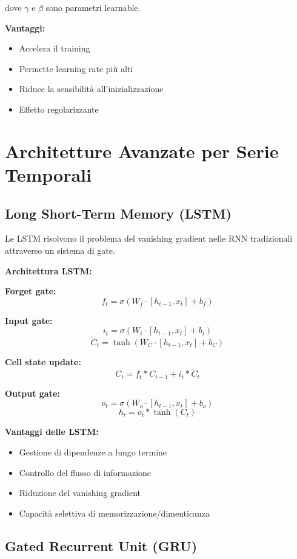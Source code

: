 \documentclass[12pt,a4paper,twoside]{report}
\begin{document}
dove $\gamma$ e $\beta$ sono parametri learnable.

\textbf{Vantaggi:}
\begin{itemize}
    \item Accelera il training
    \item Permette learning rate più alti
    \item Riduce la sensibilità all'inizializzazione
    \item Effetto regolarizzante
\end{itemize}

\section{Architetture Avanzate per Serie Temporali}

\subsection{Long Short-Term Memory (LSTM)}

Le LSTM risolvono il problema del vanishing gradient nelle RNN tradizionali attraverso un sistema di gate.

\textbf{Architettura LSTM:}

\textbf{Forget gate:}
$$f_t = \sigma(W_f \cdot [h_{t-1}, x_t] + b_f)$$

\textbf{Input gate:}
$$i_t = \sigma(W_i \cdot [h_{t-1}, x_t] + b_i)$$
$$\tilde{C}_t = \tanh(W_C \cdot [h_{t-1}, x_t] + b_C)$$

\textbf{Cell state update:}
$$C_t = f_t * C_{t-1} + i_t * \tilde{C}_t$$

\textbf{Output gate:}
$$o_t = \sigma(W_o \cdot [h_{t-1}, x_t] + b_o)$$
$$h_t = o_t * \tanh(C_t)$$

\textbf{Vantaggi delle LSTM:}
\begin{itemize}
    \item Gestione di dipendenze a lungo termine
    \item Controllo del flusso di informazione
    \item Riduzione del vanishing gradient
    \item Capacità selettiva di memorizzazione/dimenticanza
\end{itemize}

\subsection{Gated Recurrent Unit (GRU)}
\end{document}
